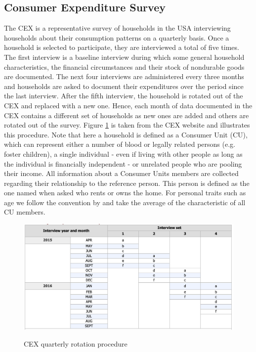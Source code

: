 \subsection{Consumer Expenditure Survey} 
The CEX is a representative survey of households in the USA interviewing households about their consumption patterns on a quarterly basis. Once a household is selected to participate, they are interviewed a total of five times. The first interview is a baseline interview during which some general household characteristics, the financial circumstances and their stock of nondurable goods are documented. The next four interviews are administered every three months and households are asked to document their expenditures over the period since the last interview. After the fifth interview, the household is rotated out of the CEX and replaced with a new one. Hence, each month of data documented in the CEX contains a different set of households as new ones are added and others are rotated out of the survey. Figure \ref{fig:cex_rotation} is taken from the CEX website and illustrates this procedure. Note that here a household is defined as a Consumer Unit (CU), which can represent either a number of blood or legally related persons (e.g. foster children), a single individual - even if living with other people as long as the individual is financially independent - or unrelated people who are pooling their income. All information about a Consumer Units members are collected regarding their relationship to the reference person. This person is defined as the one named when asked who rents or owns the home. For personal traits such as age we follow the convention by \cite{parker_etal_13} and take the average of the characteristic of all CU members. \\ 
\begin{figure}[t]
    \caption{CEX quarterly rotation procedure}
    \centering
    \includegraphics[width=.9\linewidth]{figures/CEX_rotation_table.png}
    \label{fig:cex_rotation}
\end{figure}
